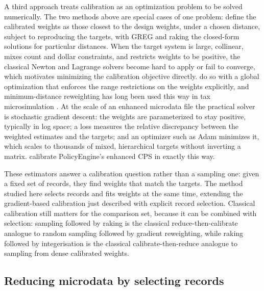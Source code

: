 A third approach treats calibration as an optimization problem to be solved numerically. The two
methods above are special cases of one problem: \citet{deville1992} define the calibrated weights as
those closest to the design weights, under a chosen distance, subject to reproducing the targets,
with GREG and raking the closed-form solutions for particular distances. When the target system is
large, collinear, mixes count and dollar constraints, and restricts weights to be positive, the
classical Newton and Lagrange solvers become hard to apply or fail to converge, which motivates
minimizing the calibration objective directly. \citet{espuny2018} do so with a global optimization
that enforces the range restrictions on the weights explicitly, and minimum-distance reweighting has
long been used this way in tax microsimulation \citep{creedy2003}. At the scale of an enhanced
microdata file the practical solver is stochastic gradient descent: the weights are parameterized to
stay positive, typically in log space; a loss measures the relative discrepancy between the weighted
estimates and the targets; and an optimizer such as Adam \citep{kingma2015} minimizes it, which
scales to thousands of mixed, hierarchical targets without inverting a matrix. \citet{woodruff2024}
calibrate PolicyEngine's enhanced CPS in exactly this way.

These estimators answer a calibration question rather than a sampling one: given a fixed set of
records, they find weights that match the targets. The method studied here selects records and fits
weights at the same time, extending the gradient-based calibration just described with explicit
record selection. Classical calibration still matters for the comparison set, because it can be
combined with selection: sampling followed by raking is the classical reduce-then-calibrate analogue
to random sampling followed by gradient reweighting, while raking followed by integerisation is the
classical calibrate-then-reduce analogue to sampling from dense calibrated weights.

\subsection{Reducing microdata by selecting records}
\label{sec:reduction_methods}

